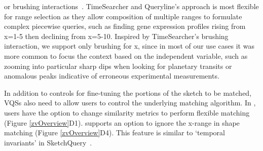 {  or brushing interactions~\cite{Hochheiser2001}. TimeSearcher and Queryline's approach is most flexible for range selection as
  they allow composition of multiple ranges to formulate complex piecewise queries, such as finding gene expression profiles
  rising from x=1-5 then declining from x=5-10. Inspired by TimeSearcher's brushing interaction, we support only brushing for x, since in most of our use cases it was more common to focus the context based on the independent variable, such as zooming into particular sharp dips when looking for planetary transits or anomalous peaks indicative of erroneous experimental measurements.
  \item  In addition to controls for fine-tuning the portions of the sketch to be matched, VQSs also need to allow users to control the underlying matching algorithm. In \zvpp, users have the option to change similarity metrics to perform flexible matching (Figure \ref{zvOverview}D1). \zvpp supports an option to ignore the x-range in shape matching (Figure \ref{zvOverview}D4). This feature is similar to `temporal invariants' in SketchQuery~\cite{correll2016semantics}.
  \enumend

}
